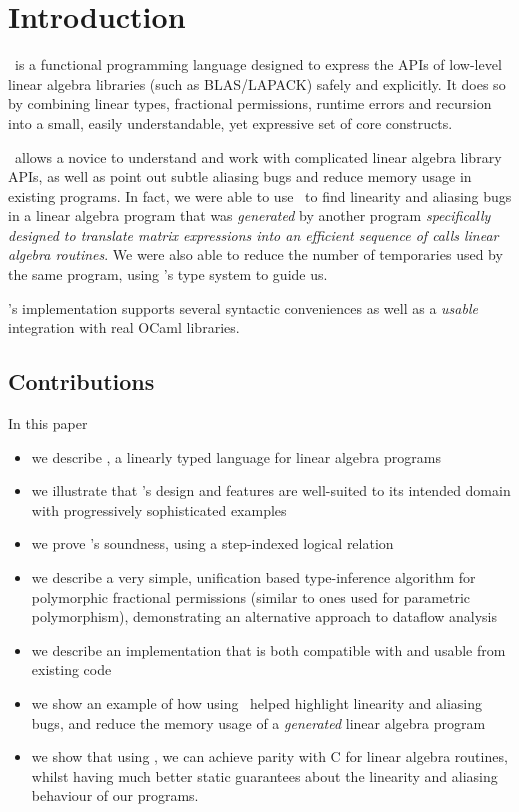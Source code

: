 \section{Introduction}

\lang\ is a functional programming language designed to express the APIs of
low-level linear algebra libraries (such as BLAS/LAPACK) safely and explicitly.
It does so by combining linear types, fractional permissions, runtime errors
and recursion into a small, easily understandable, yet expressive set of core
constructs.

\lang\ allows a novice to understand and work with complicated linear algebra
library APIs, as well as point out subtle aliasing bugs and reduce memory usage
in existing programs. In fact, we were able to use \lang\ to find linearity and
aliasing bugs in a linear algebra program that was \emph{generated} by another
program \emph{specifically designed to translate matrix expressions into an
efficient sequence of calls linear algebra routines}. We were also able to
reduce the number of temporaries used by the same program, using \lang's type
system to guide us.

\lang's implementation supports several syntactic conveniences as well as a
\emph{usable} integration with real OCaml libraries.

\subsection{Contributions}

In this paper
\begin{itemize}
    \item we describe \lang, a linearly typed language for linear algebra programs
    \item we illustrate that \lang's design and features are well-suited to its
        intended domain with progressively sophisticated examples
    \item we prove \lang's soundness, using a step-indexed logical relation
    \item we describe a very simple, unification based type-inference algorithm
        for polymorphic fractional permissions (similar to ones used for
        parametric polymorphism), demonstrating an alternative approach to
        dataflow analysis \cite{bierhoff}
    \item we describe an implementation that is both compatible with and usable
        from existing code
    \item we show an example of how using \lang\ helped highlight linearity
        and aliasing bugs, and reduce the memory usage of a \emph{generated}
        linear algebra program
    \item we show that using \lang, we can achieve parity with C for linear
        algebra routines, whilst having much better static guarantees about the
        linearity and aliasing behaviour of our programs.
\end{itemize}

